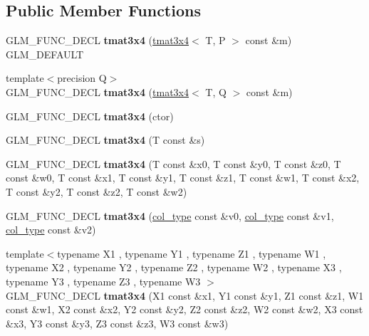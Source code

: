\subsection*{Public Member Functions}
\begin{DoxyCompactItemize}
\item 
\hypertarget{structglm_1_1tmat3x4_a8fb6fee962a6b848ba259256d649b1b9}{G\-L\-M\-\_\-\-F\-U\-N\-C\-\_\-\-D\-E\-C\-L {\bfseries tmat3x4} (\hyperlink{structglm_1_1tmat3x4}{tmat3x4}$<$ T, P $>$ const \&m) G\-L\-M\-\_\-\-D\-E\-F\-A\-U\-L\-T}\label{structglm_1_1tmat3x4_a8fb6fee962a6b848ba259256d649b1b9}

\item 
\hypertarget{structglm_1_1tmat3x4_a7bb59eb4a55a89437df372f9cc6389e1}{{\footnotesize template$<$precision Q$>$ }\\G\-L\-M\-\_\-\-F\-U\-N\-C\-\_\-\-D\-E\-C\-L {\bfseries tmat3x4} (\hyperlink{structglm_1_1tmat3x4}{tmat3x4}$<$ T, Q $>$ const \&m)}\label{structglm_1_1tmat3x4_a7bb59eb4a55a89437df372f9cc6389e1}

\item 
\hypertarget{structglm_1_1tmat3x4_a53056362b952f846303923f3326c7084}{G\-L\-M\-\_\-\-F\-U\-N\-C\-\_\-\-D\-E\-C\-L {\bfseries tmat3x4} (ctor)}\label{structglm_1_1tmat3x4_a53056362b952f846303923f3326c7084}

\item 
\hypertarget{structglm_1_1tmat3x4_adc4f850fa09747cd01c7c6664d4ceb4c}{G\-L\-M\-\_\-\-F\-U\-N\-C\-\_\-\-D\-E\-C\-L {\bfseries tmat3x4} (T const \&s)}\label{structglm_1_1tmat3x4_adc4f850fa09747cd01c7c6664d4ceb4c}

\item 
\hypertarget{structglm_1_1tmat3x4_a0fc893fef343001f05b4b87af12443a9}{G\-L\-M\-\_\-\-F\-U\-N\-C\-\_\-\-D\-E\-C\-L {\bfseries tmat3x4} (T const \&x0, T const \&y0, T const \&z0, T const \&w0, T const \&x1, T const \&y1, T const \&z1, T const \&w1, T const \&x2, T const \&y2, T const \&z2, T const \&w2)}\label{structglm_1_1tmat3x4_a0fc893fef343001f05b4b87af12443a9}

\item 
\hypertarget{structglm_1_1tmat3x4_a3a72857c9334379403f5d072eb65f3e6}{G\-L\-M\-\_\-\-F\-U\-N\-C\-\_\-\-D\-E\-C\-L {\bfseries tmat3x4} (\hyperlink{structglm_1_1tvec4}{col\-\_\-type} const \&v0, \hyperlink{structglm_1_1tvec4}{col\-\_\-type} const \&v1, \hyperlink{structglm_1_1tvec4}{col\-\_\-type} const \&v2)}\label{structglm_1_1tmat3x4_a3a72857c9334379403f5d072eb65f3e6}

\item 
\hypertarget{structglm_1_1tmat3x4_ae404d0c07577464f544bcb9ff0a43511}{{\footnotesize template$<$typename X1 , typename Y1 , typename Z1 , typename W1 , typename X2 , typename Y2 , typename Z2 , typename W2 , typename X3 , typename Y3 , typename Z3 , typename W3 $>$ }\\G\-L\-M\-\_\-\-F\-U\-N\-C\-\_\-\-D\-E\-C\-L {\bfseries tmat3x4} (X1 const \&x1, Y1 const \&y1, Z1 const \&z1, W1 const \&w1, X2 const \&x2, Y2 const \&y2, Z2 const \&z2, W2 const \&w2, X3 const \&x3, Y3 const \&y3, Z3 const \&z3, W3 const \&w3)}\label{structglm_1_1tmat3x4_ae404d0c07577464f544bcb9ff0a43511}


\end{DoxyCompactItemize}

